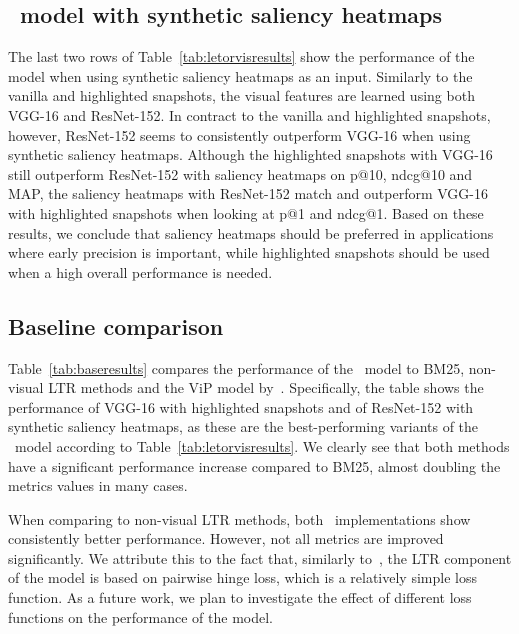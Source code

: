\subsection{\modelname~model with synthetic saliency heatmaps}
The last two rows of Table~\ref{tab:letorvisresults} show the performance of the \modelname{} mo\-del when using synthetic saliency heatmaps as an input.
Similarly to the vanilla and highlighted snapshots, the visual features are learned using both VGG-16 and ResNet-152.
In contract to the vanilla and highlighted snapshots, however, ResNet-152 seems to consistently outperform VGG-16 when using synthetic saliency heatmaps.
Although the highlighted snapshots with VGG-16 still outperform ResNet-152 with saliency heatmaps on p@10, ndcg@10 and MAP, the saliency heatmaps with ResNet-152 match and outperform VGG-16 with highlighted snapshots when looking at p@1 and ndcg@1.
Based on these results, we conclude that saliency heatmaps should be preferred in applications where early precision is important,
while highlighted snapshots should be used when a high overall performance is needed.


\subsection{Baseline comparison}
Table~\ref{tab:baseresults} compares the performance of the \modelname~model to BM25, non-visual \ac{LTR} methods and the ViP model by~\citet{fan2017learning}. 
Specifically, the table shows the performance of VGG-16 with highlighted snapshots and of ResNet-152 with synthetic saliency heatmaps, as these are the best-performing variants of the \modelname~model according to Table~\ref{tab:letorvisresults}.
We clearly see that both methods have a significant performance increase compared to BM25, almost doubling the metrics values in many cases.

When comparing to non-visual \ac{LTR} methods, both \modelname~implementations show consistently better performance.
However, not all metrics are improved significantly.
We attribute this to the fact that, similarly to~\cite{fan2017learning}, the \ac{LTR} component of the \modelname{} model is based on pairwise hinge loss, which is a relatively simple loss function.
As a future work, we plan to investigate the effect of different loss functions on the performance of the \modelname{} model.

